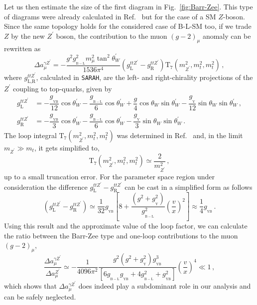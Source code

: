 \documentclass[10pt]{report}
\newcommand{\g}[2]{g_{_\mathrm{#1}}^{#2}}
\newcommand{\ro}[1]{\textrm{#1}}
\begin{document}
Let us then estimate the size of the first diagram in Fig.~\ref{fig:Barr-Zee}. This type of diagrams were already calculated in Ref.~\cite{Feng:2009gn} but for the case of a SM $Z$-boson. Since the same topology holds for the considered case of B-L-SM too, 
if we trade $Z$ by the new $Z^\prime$ boson, the contribution to the muon $(g-2)_\mu$ anomaly can be rewritten as
\begin{equation}
    \Delta a_\mu^{\gamma Z^\prime} = -\dfrac{g^2 \g{B-L}{2} m_\mu^2 \tan^2{\theta_W^\prime}}{1536 \pi^4} \left(g_{\ro{L}}^{ttZ^\prime} - g_{\ro{R}}^{ttZ^\prime}\right) {\ro{T}}_7\left( m_{Z^\prime}^2, m_t^2, m_t^2 \right)\,,
    \label{eq:agZ}
\end{equation}
where $g_{\ro{L,R}}^{ttZ^\prime}$, calculated in \texttt{SARAH}, are the left- and right-chirality projections of the $Z^\prime$ coupling to top-quarks, given by
\begin{equation}
\begin{aligned}
    g_{\ro{L}}^{ttZ^\prime} &= 
    - \dfrac{{\g{YB}{}}}{12} \cos{\theta_W^\prime}
    -\dfrac{\g{B-L}{}}{6} \cos{\theta_W^\prime} + \dfrac{g}{4} \cos{\theta_W} \sin{\theta_W^\prime} - \dfrac{\g{Y}{}}{12} \sin{\theta_W} \sin{\theta_W^\prime}\,,
    \\
    g_{\ro{R}}^{ttZ^\prime} &= 
    - \dfrac{\g{YB}{}}{3} \cos{\theta_W^\prime}
    -\dfrac{\g{B-L}{}}{6} \cos{\theta_W^\prime} - \dfrac{ \g{Y}{}}{3} \sin{\theta_W} \sin{\theta_W^\prime}\,.
\end{aligned}
\end{equation}
The loop integral $\ro{T}_7 \left(m_{Z^\prime}^2, m_t^2, m_t^2\right)$ was determined in Ref.~\cite{Feng:2009gn} and, in the limit $m_{Z^\prime} \gg m_t$, it gets simplified to,
\begin{equation}
    \ro{T}_7 \left(m_{Z^\prime}^2, m_t^2, m_t^2\right) \simeq \frac{2}{m_{Z^\prime}^2} \,,
    \label{eq:T7}
\end{equation}
up to a small truncation error. For the parameter space region under consideration the difference $g_{\ro{L}}^{ttZ^\prime} - g_{\ro{R}}^{ttZ^\prime}$ can be cast in a simplified form as follows 
\begin{equation}
    \left(g_{\ro{L}}^{ttZ^\prime} - g_{\ro{R}}^{ttZ^\prime}\right) \simeq \dfrac{1}{32} \g{YB}{} \left[ 8 + \dfrac{\left(g^2 + \g{Y}{2}\right)}{\g{B-L}{2}} \left(\dfrac{v}{x}\right)^2 \right] \approx \dfrac{1}{4} \g{YB}{} \,.
    \label{eq:gLminusgR}
\end{equation}
Using this result and the approximate value of the loop factor, we can calculate the ratio between 
the Barr-Zee type and one-loop contributions to the muon $(g-2)_{\mu}$,
\begin{equation}
    \dfrac{\Delta a_\mu^{\gamma Z^\prime}}{\Delta a_\mu^{Z^\prime}} \simeq -\dfrac{1}{4096 \pi^2}\dfrac{g^2 \left(g^2 + \g{Y}{2}\right) \g{YB}{3}}{\left[6 \g{B-L}{} \g{YB}{}  + 4\g{B-L}{2} + \g{YB}{2} \right] } \left(\dfrac{v}{x}\right)^4 \ll 1 \,,
\end{equation}
which shows that $\Delta a_\mu^{\gamma Z^\prime}$ does indeed play a subdominant role in our analysis and can be safely neglected.
\end{document}
